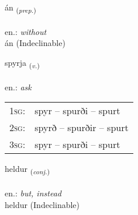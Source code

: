 \documentclass[frontgrid, backgrid]{flacards}\usepackage[]{graphicx}\usepackage[]{xcolor}
\begin{document}
{án \small{\textsubscript{(\textit{prep.})}} \\[1ex]
\textphonetic{[auːn]} \\
en.: \emph{without} \\  [2ex]
án (Indeclinable)}

\renewcommand{\flhead}{\vskip5pt \fboxsep=0pt {\small\bfseries\footnotesize Sagnorð | Verb}}
\renewcommand{\fcfoot}{\vskip5pt \fboxsep=0pt \hspace{2pt}{\small\bfseries\footnotesize 1K}}

\renewcommand{\blhead}{\vskip5pt {\small\bfseries\footnotesize Sagnorð | Verb }}
\renewcommand{\bcfoot}{\vskip5pt \hspace{2pt}{\small\bfseries\footnotesize 1K}}


{spyrja \small{\textsubscript{(\textit{v.})}} \\[1ex] %
\textphonetic{[spɪrja]} \\
en.: \emph{ask} \\  [2ex]
\renewcommand*{\arraystretch}{0.8}
\begin{tabular}{p{1cm}l}
\textsc{1sg}: & spyr -- spurði -- spurt \\ 
\textsc{2sg}: & spyrð -- spurðir -- spurt \\ 
\textsc{3sg}: & spyr -- spurði -- spurt \\ 
\end{tabular}
}


\renewcommand{\flhead}{\vskip5pt \fboxsep=0pt {\small\bfseries\footnotesize Samtenging | Conjuction}}
\renewcommand{\fcfoot}{\vskip5pt \fboxsep=0pt \hspace{2pt}{\small\bfseries\footnotesize 1K}}

\renewcommand{\blhead}{\vskip5pt {\small\bfseries\footnotesize Samtenging | Conjuction }}
\renewcommand{\bcfoot}{\vskip5pt \hspace{2pt}{\small\bfseries\footnotesize 1K}}


{heldur \small{\textsubscript{(\textit{conj.})}} \\[1ex]
\textphonetic{[hɛltʏr]} \\
en.: \emph{but, instead} \\  [2ex]
heldur (Indeclinable)}
\end{document}
